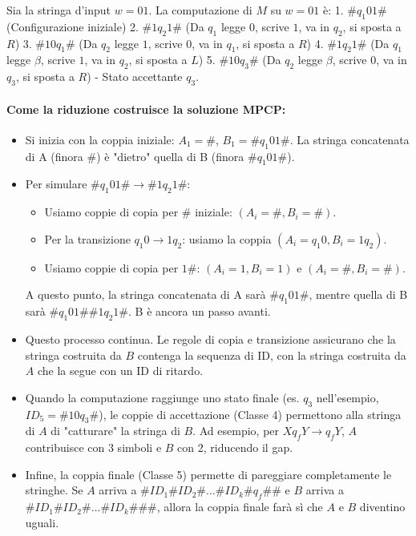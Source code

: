 \documentclass[a4paper, 11pt]{book} %
\theoremstyle{definition}
\begin{document}
Sia la stringa d'input $w = 01$.
La computazione di $M$ su $w=01$ è:
1. $\#q_1 01\#$ (Configurazione iniziale)
2. $\#1q_2 1\#$ (Da $q_1$ legge $0$, scrive $1$, va in $q_2$, si sposta a $R$)
3. $\#10q_1 \#$ (Da $q_2$ legge $1$, scrive $0$, va in $q_1$, si sposta a $R$)
4. $\#1q_2 1\#$ (Da $q_1$ legge $\beta$, scrive $1$, va in $q_2$, si sposta a $L$)
5. $\#10q_3 \#$ (Da $q_2$ legge $\beta$, scrive $0$, va in $q_3$, si sposta a $R$) - Stato accettante $q_3$.

\paragraph{Come la riduzione costruisce la soluzione MPCP:}
\begin{itemize}
    \item Si inizia con la coppia iniziale: $A_1 = \#$, $B_1 = \#q_1 01\#$.
        La stringa concatenata di A (finora $\#$) è "dietro" quella di B (finora $\#q_1 01\#$).
    \item Per simulare $\#q_1 01\# \to \#1q_2 1\#$:
        \begin{itemize}
            \item Usiamo coppie di copia per $\#$ iniziale: $(A_i = \#, B_i = \#)$.
            \item Per la transizione $q_1 0 \to 1q_2$: usiamo la coppia $(A_i = q_1 0, B_i = 1q_2)$.
            \item Usiamo coppie di copia per $1\#$: $(A_i=1, B_i=1)$ e $(A_i=\#, B_i=\#)$.
        \end{itemize}
        A questo punto, la stringa concatenata di A sarà $\#q_1 01\#$, mentre quella di B sarà $\#q_1 01\# \#1q_2 1\#$. B è ancora un passo avanti.
    \item Questo processo continua. Le regole di copia e transizione assicurano che la stringa costruita da $B$ contenga la sequenza di ID, con la stringa costruita da $A$ che la segue con un ID di ritardo.
    \item Quando la computazione raggiunge uno stato finale (es. $q_3$ nell'esempio, $ID_5 = \#10q_3\#$), le coppie di accettazione (Classe 4) permettono alla stringa di $A$ di "catturare" la stringa di $B$. Ad esempio, per $Xq_f Y \to q_f Y$, $A$ contribuisce con 3 simboli e $B$ con 2, riducendo il gap.
    \item Infine, la coppia finale (Classe 5) permette di pareggiare completamente le stringhe. Se $A$ arriva a $\#ID_1\#ID_2\# \dots \#ID_k \#q_f \# \#$ e $B$ arriva a $\#ID_1\#ID_2\# \dots \#ID_k \# \# \#$, allora la coppia finale farà sì che $A$ e $B$ diventino uguali.
\end{itemize}
\end{document}
